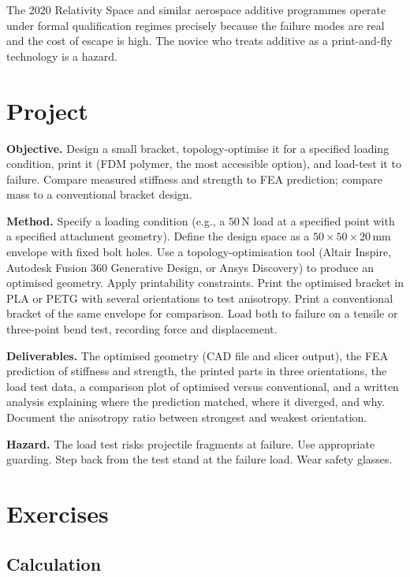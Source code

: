 The 2020 Relativity Space and similar aerospace additive programmes operate under formal qualification regimes precisely because the failure modes are real and the cost of escape is high. The novice who treats additive as a print-and-fly technology is a hazard.

\section{Project}

\begin{project}
\textbf{Objective.} Design a small bracket, topology-optimise it for a specified loading condition, print it (FDM polymer, the most accessible option), and load-test it to failure. Compare measured stiffness and strength to FEA prediction; compare mass to a conventional bracket design.

\textbf{Method.} Specify a loading condition (e.g., a $50\,\text{N}$ load at a specified point with a specified attachment geometry). Define the design space as a $50 \times 50 \times 20\,\text{mm}$ envelope with fixed bolt holes. Use a topology-optimisation tool (Altair Inspire, Autodesk Fusion 360 Generative Design, or Ansys Discovery) to produce an optimised geometry. Apply printability constraints. Print the optimised bracket in PLA or PETG with several orientations to test anisotropy. Print a conventional bracket of the same envelope for comparison. Load both to failure on a tensile or three-point bend test, recording force and displacement.

\textbf{Deliverables.} The optimised geometry (CAD file and slicer output), the FEA prediction of stiffness and strength, the printed parts in three orientations, the load test data, a comparison plot of optimised versus conventional, and a written analysis explaining where the prediction matched, where it diverged, and why. Document the anisotropy ratio between strongest and weakest orientation.

\textbf{Hazard.} The load test risks projectile fragments at failure. Use appropriate guarding. Step back from the test stand at the failure load. Wear safety glasses.
\end{project}

\section{Exercises}

\subsection*{Calculation}

